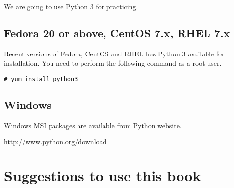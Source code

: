 We are going to use Python 3 for practicing.

\subsection{Fedora 20 or above, CentOS 7.x, RHEL 7.x}

Recent versions of Fedora, CentOS and RHEL has Python 3 available for
installation.  You need to perform the following command as a root user.

\begin{verbatim}
# yum install python3
\end{verbatim}

\subsection{Windows}

Windows MSI packages are available from Python website.

\url{http://www.python.org/download}

\section{Suggestions to use this book}
